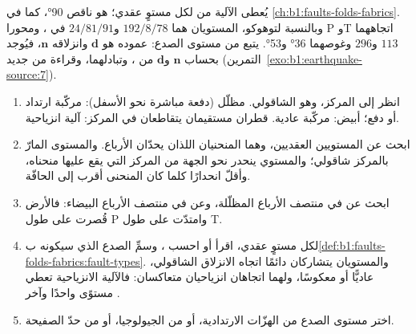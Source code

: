 \begin{omfigure}
\label{fig:b1:earthquake-source:beachballs}
\end{omfigure}

يُعطى الآلية من    لكل مستوٍ عقدي؛  هو  ناقص \ang{90}، كما في \cref{ch:b1:faults-folds-fabrics}. وبالنسبة لتوهوكو، المستويان هما $192/8/78$ و$24/81/91$ في   ، ومحورا P وT اتجاههما $113$ و$296$ وغوصهما \ang{36} و\ang{53}.  يتبع من مستوى الصدع: عموده هو $\mathbf d$ وانزلاقه $\mathbf n$، فيُوجد بحساب $\mathbf n$ و$\mathbf d$ من   ، وتبادلهما، وقراءة    من جديد (التمرين~\ref{exo:b1:earthquake-source:7}).

\begin{method}\label{met:b1:earthquake-source:beachball}
\begin{enumerate}
  \item انظر إلى المركز، وهو الشاقولي. مظلّل (دفعة مباشرة نحو الأسفل): مركّبة ارتداد أو دفع؛ أبيض: مركّبة عادية. قطران مستقيمان يتقاطعان في المركز: آلية انزياحية.
  \item ابحث عن المستويين العقديين، وهما المنحنيان اللذان يحدّان الأرباع. والمستوى المارّ بالمركز شاقولي؛ والمستوي ينحدر نحو الجهة من المركز التي يقع عليها منحناه، وأقلّ انحدارًا كلما كان المنحنى أقرب إلى الحافّة.
  \item ابحث عن  في منتصف الأرباع المظلّلة، وعن  في منتصف الأرباع البيضاء: فالأرض قُصرت على طول P وامتدّت على طول T.
  \item لكل مستوٍ عقدي، اقرأ أو احسب ، وسمِّ الصدع الذي سيكونه ب\cref{def:b1:faults-folds-fabrics:fault-types}. والمستويان يتشاركان دائمًا اتجاه الانزلاق الشاقولي، عاديًّا أو معكوسًا، ولهما اتجاهان انزياحيان متعاكسان: فالآلية الانزياحية تعطي مستوًى واحدًا  وآخر .
  \item اختر مستوى الصدع من الهزّات الارتدادية، أو من الجيولوجيا، أو من حدّ الصفيحة.
\end{enumerate}
\end{method}

